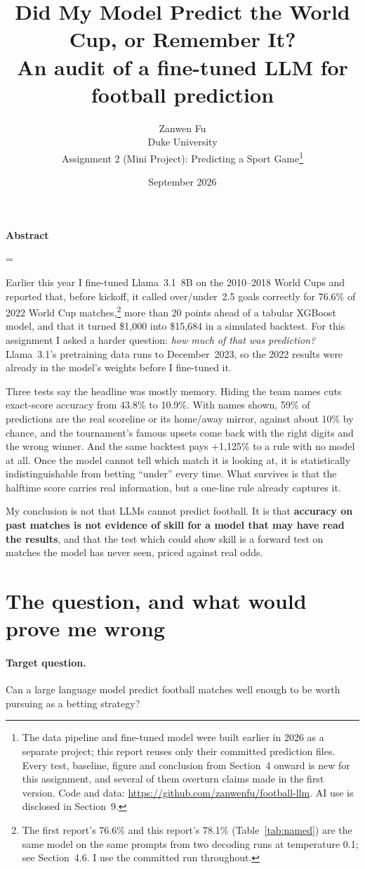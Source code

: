 \documentclass[10pt,letterpaper]{article}
\title{\bfseries\Large Did My Model Predict the World Cup, or Remember It?\\[3pt]
  \large An audit of a fine-tuned LLM for football prediction}
\author{Zanwen Fu\\
  Duke University\\
  \small Assignment 2 (Mini Project): Predicting a Sport Game\thanks{The data pipeline and
  fine-tuned model were built earlier in 2026 as a separate project; this report reuses
  only their committed prediction files. Every test, baseline, figure and conclusion from
  Section~4 onward is new for this assignment, and several of them overturn claims made in
  the first version. Code and data: \url{https://github.com/zanwenfu/football-llm}. AI use
  is disclosed in Section~9.}}
\date{September 2026}
\renewenvironment{abstract}{%
  \vspace{4pt}\centerline{\bfseries\large Abstract}\vspace{6pt}%
  \begin{list}{}{\leftmargin=0.5in\rightmargin=\leftmargin}\item\relax\small}
  {\end{list}\vspace{6pt}}
\begin{document}
\maketitle

\begin{abstract}
Earlier this year I fine-tuned Llama~3.1~8B on the 2010--2018 World Cups and reported that,
before kickoff, it called over/under~2.5 goals correctly for 76.6\% of 2022 World Cup
matches,\footnote{The first report's 76.6\% and this report's 78.1\% (Table~\ref{tab:named})
are the same model on the same prompts from two decoding runs at temperature 0.1; see
Section~4.6. I use the committed run throughout.} more than 20 points ahead of a tabular
XGBoost model, and that it turned \$1{,}000 into \$15{,}684 in a simulated backtest. For this
assignment I asked a harder question: \emph{how much of that was prediction?} Llama~3.1's
pretraining data runs to December~2023, so the 2022 results were already in the model's
weights before I fine-tuned it.

Three tests say the headline was mostly memory. Hiding the team names cuts exact-score
accuracy from 43.8\% to 10.9\%. With names shown, 59\% of predictions are the real scoreline
or its home/away mirror, against about 10\% by chance, and the tournament's famous upsets come
back with the right digits and the wrong winner. And the same backtest pays +1{,}125\% to a
rule with no model at all. Once the model cannot tell which match it is looking at, it is
statistically indistinguishable from betting ``under'' every time. What survives is that the
halftime score carries real information, but a one-line rule already captures it.

My conclusion is not that LLMs cannot predict football. It is that \textbf{accuracy on past
matches is not evidence of skill for a model that may have read the results}, and that the
test which could show skill is a forward test on matches the model has never seen, priced
against real odds.
\end{abstract}

\section{The question, and what would prove me wrong}

\paragraph{Target question.} Can a large language model predict football matches well enough
to be worth pursuing as a betting strategy?
\end{document}

